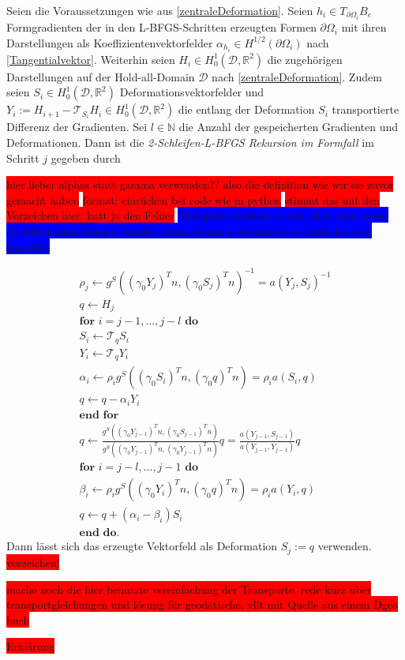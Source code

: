 \begin{defi}
\label{2loopbfgs}
	Seien die Voraussetzungen wie aus \ref{zentraleDeformation}. Seien $h_i \in T_{\partial\Omega_i}B_e$ Formgradienten der in den L-BFGS-Schritten erzeugten Formen $\partial\Omega_i$ mit ihren Darstellungen als Koeffizientenvektorfelder $\alpha_{h_i} \in H^{1/2}(\partial\Omega_i)$ nach \ref{Tangentialvektor}. Weiterhin seien $H_i \in H^1_0(\mathcal{D}, \mathbb{R}^2)$ die zugehörigen Darstellungen auf der Hold-all-Domain $\mathcal{D}$ nach \ref{zentraleDeformation}. Zudem seien $S_i \in H^1_0(\mathcal{D}, \mathbb{R}^2)$ Deformationsvektorfelder und $Y_i := H_{i+1} - \mathcal{T}_{S_i}H_i \in H^1_0(\mathcal{D}, \mathbb{R}^2)$ die entlang der Deformation $S_i$ transportierte Differenz der Gradienten. Sei $l \in \mathbb{N}$ die Anzahl der gespeicherten Gradienten und Deformationen. Dann ist die \textit{2-Schleifen-L-BFGS Rekursion im Formfall} im Schritt $j$ gegeben durch 

\colorbox{red}{hier lieber alphas statt gamma verwenden?? also die definition wie wir sie zuvor gemacht haben}
\colorbox{red}{format: einrücken bei code wie in python}
\colorbox{red}{stimmt das mit den Vorzeichen hier: hatt ja den Fehler}
\colorbox{blue}{Transporte müssen so sein, dass man in der aktuellen form Omega j landet, wenn ich um q verschiebe, so lande ist aber irgendwo}

\begin{align*}
	\rho_j \leftarrow g^S((\gamma_0 Y_j)^Tn, (\gamma_0 S_j)^Tn)^{-1} = a(Y_j, S_j)^{-1} \\
		q \leftarrow H_j \\
	\textbf{for } i = j - 1, \dots, j - l \textbf{ do} \\
		S_i \leftarrow \mathcal{T}_q S_i \\
		Y_i \leftarrow \mathcal{T}_q Y_i \\
		\alpha_i \leftarrow \rho_i g^S((\gamma_0 S_i)^Tn, (\gamma_0 q)^T n) = \rho_i a(S_i, q) \\
				q \leftarrow q - \alpha_i Y_i \\
	\textbf{end for} \\
	q \leftarrow \frac{g^S((\gamma_0 Y_{j-1})^Tn, (\gamma_0 S_{j-1})^Tn)}{g^S((\gamma_0 Y_{j-1})^Tn, (\gamma_0 Y_{j-1})^Tn)}q = \frac{a(Y_{j-1}, S_{j-1})}{a(Y_{j-1}, Y_{j-1})}q \\	
	\textbf{for } i = j - l, \dots, j - 1 \textbf{ do} \\
		\beta_i \leftarrow \rho_i g^S((\gamma_0 Y_i)^Tn, (\gamma_0 q)^Tn) = \rho_i a(Y_i, q) \\
		q \leftarrow q + (\alpha_i - \beta_i)S_i \\
		\textbf{end do.}
\end{align*}
	Dann lässt sich das erzeugte Vektorfeld als Deformation $S_j := q$ verwenden. \colorbox{red}{vorzeichen!}
\end{defi}

\colorbox{red}{mache noch die hier benutzte vereinfachung der Transporte, rede kurz über transportgleichungen und lösung für geodätische, vllt mit Quelle aus einem Dgeo buch}


\colorbox{red}{Erklärung}

